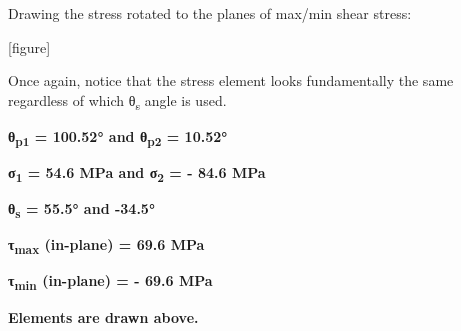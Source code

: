 \documentclass[
  letterpaper,
  DIV=11,
  numbers=noendperiod]{scrreprt}
\begin{document}
\begin{tcolorbox}
\begin{tcolorbox}
Drawing the stress rotated to the planes of max/min shear stress:

{[}figure{]}

Once again, notice that the stress element looks fundamentally the same
regardless of which θ\textsubscript{s} angle is used.

\textbf{θ\textsubscript{p1} = 100.52° and θ\textsubscript{p2} = 10.52°}

\textbf{σ\textsubscript{1} = 54.6 MPa and σ\textsubscript{2} = - 84.6
MPa}

\textbf{θ\textsubscript{s} = 55.5° and -34.5°}

\textbf{τ\textsubscript{max} (in-plane) = 69.6 MPa}

\textbf{τ\textsubscript{min} (in-plane) = - 69.6 MPa}

\textbf{Elements are drawn above.}

\end{tcolorbox}

\end{tcolorbox}
\end{document}
